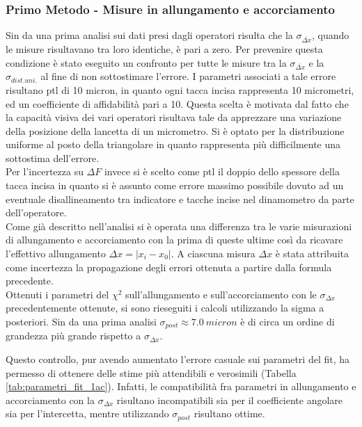 \documentclass[a4paper,11pt,oneside]{article}
\begin{document}
\subsubsection*{Primo Metodo - Misure in allungamento e accorciamento}
Sin da una prima analisi sui dati presi dagli operatori risulta che la $\sigma_{\overline{\Delta x}}$, quando le misure risultavano tra loro identiche, è pari a zero. Per prevenire questa condizione è stato eseguito un confronto per tutte le misure tra la $\sigma_{\overline{\Delta x}}$ e la $\sigma_{dist. uni.}$ al fine di non sottostimare l'errore. I parametri associati a tale errore risultano ptl di 10 micron, in quanto ogni tacca incisa rappresenta 10 micrometri, ed un coefficiente di affidabilità pari a 10. Questa scelta è motivata dal fatto che la capacità visiva dei vari operatori risultava tale da apprezzare una variazione della posizione della lancetta di un micrometro. Si è optato per la distribuzione uniforme al posto della triangolare in quanto rappresenta più difficilmente una sottostima dell'errore.\\
Per l'incertezza su $\Delta F$ invece si è scelto come ptl il doppio dello spessore della tacca incisa in quanto si è assunto come errore massimo possibile dovuto ad un eventuale disallineamento tra indicatore e tacche incise nel dinamometro da parte dell'operatore.\\

Come già descritto nell'analisi si è operata una differenza tra le varie misurazioni di allungamento e accorciamento con la prima di queste ultime così da ricavare l'effettivo allungamento $\Delta x=| x_{i}-x_{0}|$. A ciascuna misura $\Delta x$ è stata attribuita come incertezza la propagazione degli errori ottenuta a partire dalla formula precedente.\\

Ottenuti i parametri del ${\chi}^2$ sull'allungamento e sull'accorciamento con le $\sigma_{\Delta x}$ precedentemente ottenute, si sono rieseguiti i calcoli utilizzando la sigma a posteriori. Sin da una prima analisi $\sigma_{post} \approx \SI{7.0}{micron}$ è di circa un ordine di grandezza più grande rispetto a $\sigma_{\Delta x}$.

Questo controllo, pur avendo aumentato l'errore casuale sui parametri del fit, ha permesso di ottenere delle stime più attendibili e verosimili (Tabella \ref{tab:parametri_fit_1ac}). Infatti, le compatibilità fra parametri in allungamento e accorciamento con la $\sigma_{\Delta x}$ risultano incompatibili sia per il coefficiente angolare sia per l'intercetta, mentre utilizzando $\sigma_{post}$ risultano ottime.
\end{document}
